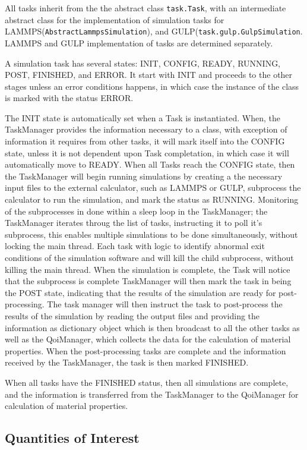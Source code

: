All tasks inherit from the the abstract class \verb|task.Task|, with an intermediate abstract class for the implementation of simulation tasks for LAMMPS(\verb|AbstractLammpsSimulation|), and GULP(\verb|task.gulp.GulpSimulation|.  LAMMPS and GULP implementation of tasks are determined separately.

A simulation task has several states: INIT, CONFIG, READY, RUNNING, POST, FINISHED, and ERROR.  It start with INIT and proceeds to the other stages unless an error conditions happens, in which case the instance of the class is marked with the status ERROR.

The INIT state is automatically set when a Task is instantiated.
When, the TaskManager provides the information necessary to a class, with exception of information it requires from other tasks, it will mark itself into the CONFIG state, unless it is not dependent upon Task completation, in which case it will automatically move to READY.
When all Tasks reach the CONFIG state, then the TaskManager will begin running simulations by creating a the necessary input files to the external calculator, such as LAMMPS or GULP, subprocess the calculator to run the simulation, and mark the status as RUNNING.
Monitoring of the subprocesses in done within a sleep loop in the TaskManager; the TaskManager iterates throug the list of tasks, instructing it to poll it's subprocess, this enables multiple simulations to be done simultaneously, without locking the main thread.  Each task with logic to identify abnormal exit conditions of the simulation software and will kill the child subprocess, without killing the main thread.
When the simulation is complete, the Task will notice that the subprocess is complete TaskManager will then mark the task in being the POST state, indicating that the results of the simulation are ready for post-processing.  The task manager will then instruct the task to post-process the results of the simulation by reading the output files and providing the information as dictionary object which is then broadcast to all the other tasks as well as the QoiManager, which collects the data for the calculation of material properties.  When the post-processing tasks are complete and the information received by the TaskManager, the task is then marked FINISHED.

When all tasks have the FINISHED status, then all simulations are complete, and the information is transferred from the TaskManager to the QoiManager for calculation of material properties.
\subsection{Quantities of Interest}

